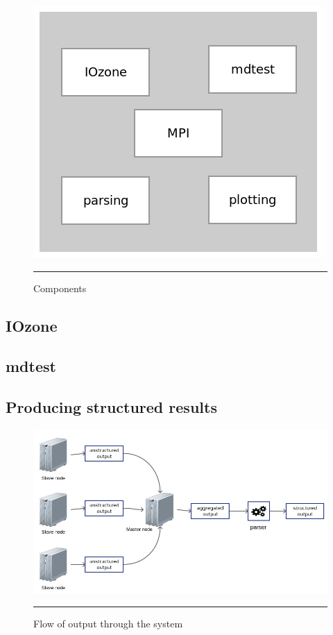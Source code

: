 \begin{figure}[H]
  \centering
    \includegraphics[scale=0.5]{Figures/components.png}
    \rule{25em}{0.5pt}
  \caption[Components]{Components}
  \label{fig:components}
\end{figure}

\subsection{IOzone}


\subsection{mdtest}





\subsection{Producing structured results}


\begin{figure}[H]
  \centering
    \includegraphics[scale=0.5]{Figures/output_flow.png}
    \rule{25em}{0.5pt}
  \caption[Flow of output through the system]{Flow of output through the system}
  \label{fig:output_flow}
\end{figure}


